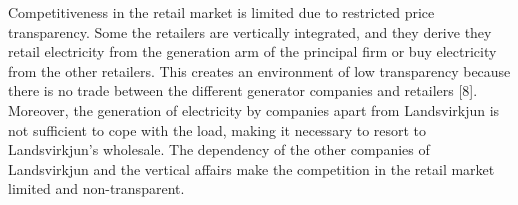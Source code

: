 \documentclass[svn, final]{rureport}
\begin{document}
Competitiveness in the retail market is limited due to restricted price transparency. Some the retailers are vertically integrated, and they derive they retail electricity from the generation arm of the principal firm or buy electricity from the other retailers. This creates an environment of low transparency because there is no trade between the different generator companies and retailers [8]. Moreover, the generation of electricity by companies apart from Landsvirkjun is not sufficient to cope with the load, making it necessary to resort to Landsvirkjun’s wholesale. The dependency of the other companies of Landsvirkjun and the vertical affairs make the competition in the retail market limited and non-transparent. 

\newpage





\end{document}

